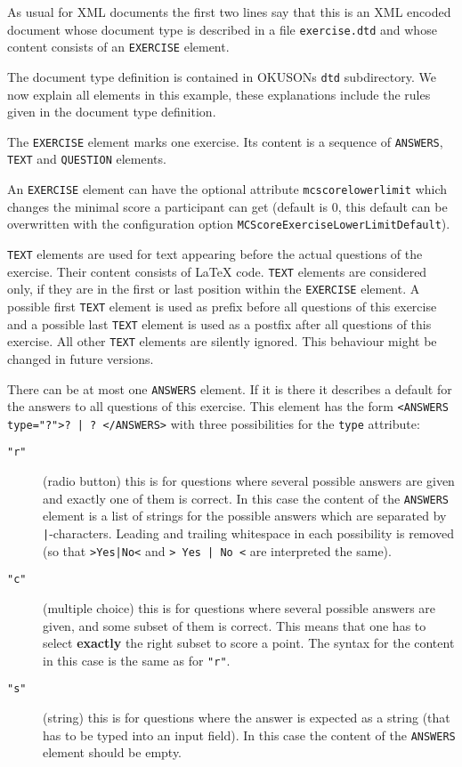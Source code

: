 \documentclass[12pt,openany,a4paper]{book}
\newcommand{\OKUSON}{\textsf{OKUSON}}
\begin{document}
As  usual  for  XML  documents  the   first  two  lines  say  that  this  is
an  XML  encoded  document  whose  document type  is  described  in  a  file
\texttt{exercise.dtd}  and whose  content consists  of an  \texttt{EXERCISE}
element.

The document type definition  is contained in {\OKUSON}s \texttt{dtd} 
subdirectory. We now explain all elements in this example, these
explanations include the rules given in the document type definition.

The \texttt{EXERCISE} element  marks one exercise. Its content is a sequence
of \texttt{ANSWERS}, \texttt{TEXT} and \texttt{QUESTION} elements. 

An \texttt{EXERCISE} element can have the optional attribute
\texttt{mcscorelowerlimit} which changes the minimal score a participant
can get (default is $0$, this default can be overwritten with the
configuration option \texttt{MCScoreExerciseLowerLimitDefault}).

\texttt{TEXT} elements are used for text appearing before
the actual questions of the exercise. Their content consists of
{\LaTeX} code. \texttt{TEXT} elements are considered only, if they are in
the first or last position within the \texttt{EXERCISE} element. A possible
first \texttt{TEXT} element is used as prefix before all questions of this
exercise and a possible last \texttt{TEXT} element is used as a postfix
after all questions of this exercise. All other \texttt{TEXT} elements are
silently ignored. This behaviour might be changed in future versions.

There can be at most one \texttt{ANSWERS} element. If it is there it
describes a default for the answers to all questions of this exercise.
This element has the form 
\texttt{<ANSWERS type="?">? | ? </ANSWERS>} with three possibilities for
the \texttt{type} attribute:
\begin{description}
\item[\texttt{"r"}] (radio button) this is for questions where several possible answers 
are given and exactly one of them is correct. In this case the content of
the \texttt{ANSWERS} element is a list of strings for the possible answers
which are separated by \verb+|+-characters. Leading and trailing whitespace
in each possibility is removed (so that \texttt{>Yes|No<} and \texttt{>  Yes |
No <} are interpreted the same).
\item[\texttt{"c"}] (multiple choice) this is for questions where several
possible answers are given, and some subset of them is correct. This means
that one has to select \textbf{exactly} the right subset to score a 
point. The syntax for the content in this case is the same as for
\texttt{"r"}.
\item[\texttt{"s"}] (string) this is for questions where the answer is
expected as a string (that has to be typed into an input field). In this
case the content of the \texttt{ANSWERS} element should be empty.
\end{description}
\end{document}
